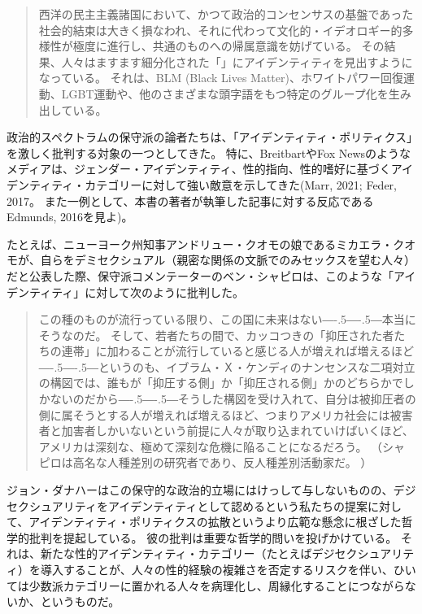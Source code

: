 \documentclass[paper=a4,book,openany]{jlreq}
\def\DDASH{―\kern-.5\zw―\kern-.5\zw―} %
\begin{document}
\begin{quote}
西洋の民主主義諸国において、かつて政治的コンセンサスの基盤であった社会的結束は大きく損なわれ、それに代わって文化的・イデオロギー的多様性が極度に進行し、共通のものへの帰属意識を妨げている。
その結果、人々はますます細分化された「」にアイデンティティを見出すようになっている。
それは、BLM (Black Lives Matter)、ホワイトパワー回復運動、LGBT運動や、他のさまざまな頭字語をもつ特定のグループ化を生み出している。
\citep{gardels18:_franc_fukuy}
\end{quote}

政治的スペクトラムの保守派の論者たちは、「アイデンティティ・ポリティクス」を激しく批判する対象の一つとしてきた。
特に、BreitbartやFox Newsのようなメディアは、ジェンダー・アイデンティティ、性的指向、性的嗜好に基づくアイデンティティ・カテゴリーに対して強い敵意を示してきた(Marr, 2021; Feder, 2017。
また一例として、本書の著者が執筆した記事に対する反応であるEdmunds, 2016を見よ)。
\nocite{edmunds16:_eco_sexual_boast_mastur_water}
\nocite{marr21:_fox_news_has_consis_enabl,feder17:_steve_bannon_gay_agend}

たとえば、ニューヨーク州知事アンドリュー・クオモの娘であるミカエラ・クオモが、自らをデミセクシュアル（親密な関係の文脈でのみセックスを望む人々）だと公表した際、保守派コメンテーターのベン・シャピロは、このような「アイデンティティ」に対して次のように批判した。

\begin{quote}
この種のものが流行っている限り、この国に未来はない{\DDASH}本当にそうなのだ。
そして、若者たちの間で、カッコつきの「抑圧された者たちの連帯」に加わることが流行していると感じる人が増えれば増えるほど{\DDASH}というのも、イブラム・Ｘ・ケンディのナンセンスな二項対立の構図では、誰もが「抑圧する側」か「抑圧される側」かのどちらかでしかないのだから{\DDASH}そうした構図を受け入れて、自分は被抑圧者の側に属そうとする人が増えれば増えるほど、つまりアメリカ社会には被害者と加害者しかいないという前提に人々が取り込まれていけばいくほど、アメリカは深刻な、極めて深刻な危機に陥ることになるだろう。
\citep{shapiro21:_andrew_cuomos_daugh_comes_out_demis} （シャピロは高名な人種差別の研究者であり、反人種差別活動家だ。
）

\end{quote}

ジョン・ダナハーはこの保守的な政治的立場にはけっして与しないものの、デジセクシュアリティをアイデンティティとして認めるという私たちの提案に対して、アイデンティティ・ポリティクスの拡散というより広範な懸念に根ざした哲学的批判を提起している。
彼の批判は重要な哲学的問いを投げかけている。
それは、新たな性的アイデンティティ・カテゴリー（たとえばデジセクシュアリティ）を導入することが、人々の性的経験の複雑さを否定するリスクを伴い、ひいては少数派カテゴリーに置かれる人々を病理化し、周縁化することにつながらないか、というものだ。
\end{document}
